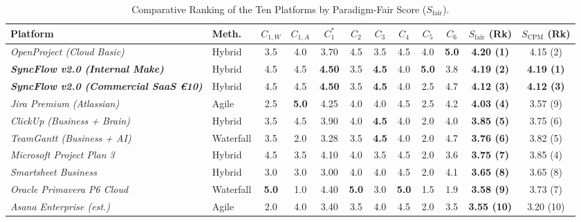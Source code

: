 \begin{table}[H]
	\centering
	\scriptsize
	\setlength{\tabcolsep}{2.2pt}
	\renewcommand{\arraystretch}{1.12}
	\caption*{Comparative Ranking of the Ten Platforms by Paradigm-Fair Score ($S_{\text{fair}}$).}
	\begin{tabularx}{\textwidth}{>{\raggedright\arraybackslash}X l c c c c c c c c c c}
		\toprule
		\textbf{Platform} & \textbf{Meth.} & \textbf{$C_{1,W}$} & \textbf{$C_{1,A}$} & \textbf{$C_1^*$} & \textbf{$C_2$} & \textbf{$C_3$} & \textbf{$C_4$} & \textbf{$C_5$} & \textbf{$C_6$} & \textbf{$S_{\text{fair}}$ (Rk)} & \textbf{$S_{\text{CPM}}$ (Rk)} \\
		\midrule
		\textit{OpenProject (Cloud Basic)} & Hybrid & 3.5 & 4.0 & 3.70 & 4.5 & 3.5 & 4.5 & 4.0 & \textbf{5.0} & \textbf{4.20 (1)} & 4.15 (2) \\
		\textbf{\textit{SyncFlow v2.0 (Internal Make)}} & Hybrid & 4.5 & 4.5 & \textbf{4.50} & 3.5 & \textbf{4.5} & 4.0 & \textbf{5.0} & 3.8 & \textbf{4.19 (2)} & \textbf{4.19 (1)} \\
		\textbf{\textit{SyncFlow v2.0 (Commercial SaaS €10)}} & Hybrid & 4.5 & 4.5 & \textbf{4.50} & 3.5 & \textbf{4.5} & 4.0 & 2.5 & 4.7 & \textbf{4.12 (3)} & \textbf{4.12 (3)} \\
		\textit{Jira Premium (Atlassian)} & Agile & 2.5 & \textbf{5.0} & 4.25 & 4.0 & 4.0 & 4.5 & 2.5 & 4.2 & \textbf{4.03 (4)} & 3.57 (9) \\
		\textit{ClickUp (Business + Brain)} & Hybrid & 3.5 & 4.5 & 3.90 & 4.0 & \textbf{4.5} & 4.0 & 2.0 & 4.0 & \textbf{3.85 (5)} & 3.75 (6) \\
		\textit{TeamGantt (Business + AI)} & Waterfall & 3.5 & 2.0 & 3.28 & 3.5 & \textbf{4.5} & 4.0 & 2.0 & 4.7 & \textbf{3.76 (6)} & 3.82 (5) \\
		\textit{Microsoft Project Plan 3} & Hybrid & 4.5 & 3.5 & 4.10 & 4.0 & 3.5 & 4.5 & 2.0 & 3.6 & \textbf{3.75 (7)} & 3.85 (4) \\
		\textit{Smartsheet Business} & Hybrid & 3.0 & 3.0 & 3.00 & 4.0 & 4.0 & 4.5 & 2.0 & 4.1 & \textbf{3.65 (8)} & 3.65 (8) \\
		\textit{Oracle Primavera P6 Cloud} & Waterfall & \textbf{5.0} & 1.0 & 4.40 & \textbf{5.0} & 3.0 & \textbf{5.0} & 1.5 & 1.9 & \textbf{3.58 (9)} & 3.73 (7) \\
		\textit{Asana Enterprise (est.)} & Agile & 2.0 & 4.0 & 3.40 & 3.5 & 4.0 & 4.5 & 2.0 & 3.5 & \textbf{3.55 (10)} & 3.20 (10) \\
		\bottomrule
	\end{tabularx}
\end{table}

